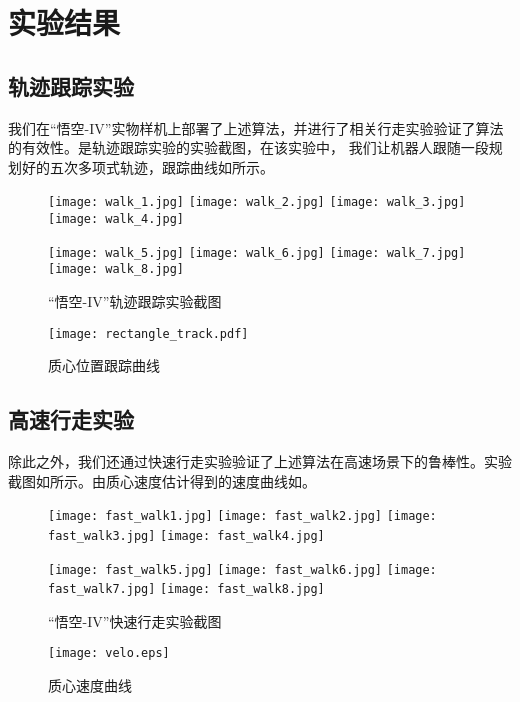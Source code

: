 \section{实验结果}
\subsection{轨迹跟踪实验}
\label{sec:controller_exp}
我们在“悟空-IV”实物样机上部署了上述算法，并进行了相关行走实验验证了算法的有效性。是轨迹跟踪实验的实验截图，在该实验中，
我们让机器人跟随一段规划好的五次多项式轨迹，跟踪曲线如所示。
\begin{figure}[htbp]
    \centering
    \texttt{[image: walk\_1.jpg]}
    \texttt{[image: walk\_2.jpg]}
    \texttt{[image: walk\_3.jpg]}
    \texttt{[image: walk\_4.jpg]}

    \texttt{[image: walk\_5.jpg]}
    \texttt{[image: walk\_6.jpg]}
    \texttt{[image: walk\_7.jpg]}
    \texttt{[image: walk\_8.jpg]}   
    \caption{\label{fig:track_exp}“悟空-IV”轨迹跟踪实验截图}
\end{figure}
\begin{figure}[htbp]
    \centering
    \texttt{[image: rectangle\_track.pdf]}
    \caption{\label{fig:com_pos_track}质心位置跟踪曲线}
\end{figure}
\subsection{高速行走实验}
除此之外，我们还通过快速行走实验验证了上述算法在高速场景下的鲁棒性。实验截图如所示。由质心速度估计得到的速度曲线如。
\begin{figure}[htbp]
    \centering
    \texttt{[image: fast\_walk1.jpg]}
    \texttt{[image: fast\_walk2.jpg]}
    \texttt{[image: fast\_walk3.jpg]}
    \texttt{[image: fast\_walk4.jpg]}

    \texttt{[image: fast\_walk5.jpg]}
    \texttt{[image: fast\_walk6.jpg]}
    \texttt{[image: fast\_walk7.jpg]}
    \texttt{[image: fast\_walk8.jpg]}   
    \caption{\label{fig:track_exp}“悟空-IV”快速行走实验截图}
\end{figure}
\begin{figure}[htbp]
    \centering
    \texttt{[image: velo.eps]}
    \caption{\label{fig:com_vel_track}质心速度曲线}
\end{figure}
\newpage

